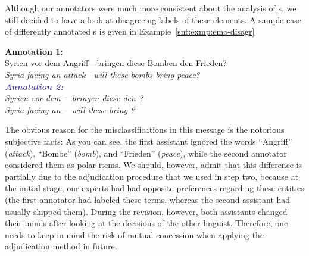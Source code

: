 Although our annotators were much more consistent about the analysis
of s, we still decided to have a look at
disagreeing labels of these elements.  A sample case of differently
annotated s is given in
Example~\ref{snt:exmp:emo-disagr}
\begin{example}\label{snt:exmp:emo-disagr}
  \textcolor{red3}{\textbf{Annotation 1:}}\\ \upshape{}Syrien vor dem
  Angriff---bringen diese Bomben den Frieden?\\[0.3em]\itshape
  \noindent\itshape{}Syria facing an attack---will these bombs bring
  peace?\\

  \noindent\textcolor{darkslateblue}{\textbf{\itshape Annotation
      2:}}\\ \upshape{}Syrien vor dem
  \emoexpression{\textcolor{red}{Angriff}}---bringen diese
  \emoexpression{\textcolor{red}{Bomben}} den
  \emoexpression{\textcolor{red}{Frieden}}?\\[0.3em]
  \noindent\itshape{}Syria facing an
  \upshape{}\itshape{}---will
  these
  \upshape{}\itshape{}
  bring
  \upshape{}\itshape{}?
\end{example}
The obvious reason for the misclassifications in this message is the
notorious subjective facts: As you can see, the first assistant
ignored the words ``Angriff'' (\emph{attack}), ``Bombe''
(\emph{bomb}), and ``Frieden'' (\emph{peace}), while the second
annotator considered them as polar items.
We should, however, admit that this difference is partially due to the
adjudication procedure that we used in step two, because at the
initial stage, our experts had had opposite preferences regarding
these entities (the first annotator had labeled these terms, whereas
the second assistant had usually skipped them).  During the revision,
however, both assistants changed their minds after looking at the
decisions of the other linguist.  Therefore, one needs to keep in mind
the risk of mutual concession when applying the adjudication method in
future.

